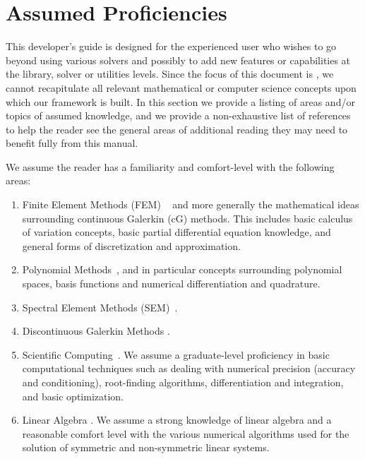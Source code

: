 \section{Assumed Proficiencies}

This developer's guide is designed for the experienced \shp{} user who wishes to go beyond
using various \nek{} solvers and possibly to add new features or capabilities at the library,
solver or utilities levels.  Since the focus of this document is \nek{}, we cannot 
recapitulate all relevant mathematical or computer science concepts upon which our
framework is built.  In this section we provide a listing of areas and/or topics of 
assumed knowledge, and we provide a non-exhaustive list of references to help
the reader see the general areas of additional reading they may need to benefit fully
from this manual.

We assume the reader has a familiarity and comfort-level with the following areas:

\begin{enumerate}
\item Finite Element Methods (FEM) ~\cite{Hughes87,Schwab,BaSzKa81} and more generally the mathematical ideas 
surrounding continuous Galerkin (cG) methods.  This includes basic calculus of variation concepts, basic
partial differential equation knowledge, and general forms of discretization and approximation.

\item Polynomial Methods~\cite{CanutoHQZ87,Funaro92,HGG}, and in particular concepts surrounding polynomial
spaces, basis functions and numerical differentiation and quadrature.

\item Spectral Element Methods (SEM)~\cite{DevilleFM02,KaSh05}.

\item Discontinuous Galerkin Methods \cite{CockburnKS,HesthavenW08}.

\item Scientific Computing~\cite{Heath,KarniadakisK03}.  We assume a graduate-level proficiency in basic
computational techniques such as dealing with numerical precision (accuracy and conditioning), root-finding algorithms,
differentiation and integration, and basic optimization.

\item Linear Algebra \cite{TrefethenB97,Demmel97}.  We assume a strong knowledge of linear algebra and a reasonable 
comfort level with the various numerical algorithms used for the solution of symmetric and non-symmetric linear systems.
\end{enumerate}

